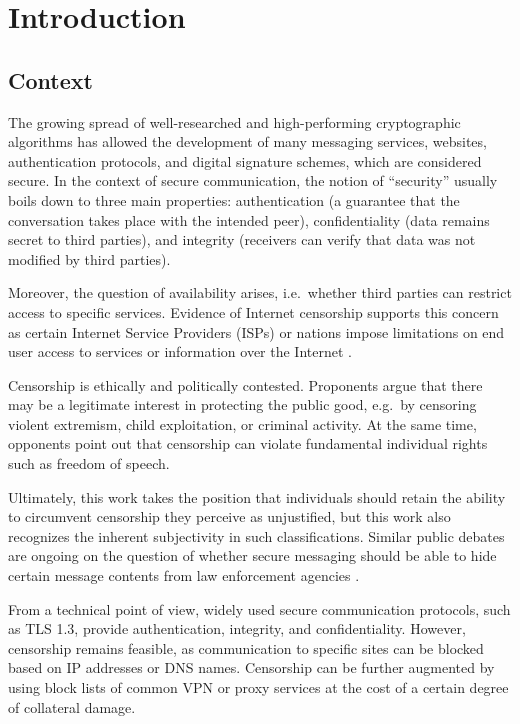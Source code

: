 \chapter{Introduction}\label{ch:introduction}

\section{Context} \label{sec:context}

The growing spread of well-researched and high-performing cryptographic algorithms has allowed the development of many messaging services, websites, authentication protocols, and digital signature schemes, which are considered secure.
In the context of secure communication, the notion of ``security'' usually boils down to three main properties: authentication (a guarantee that the conversation takes place with the intended peer), confidentiality (data remains secret to third parties), and integrity (receivers can verify that data was not modified by third parties).

Moreover, the question of availability arises, i.e.~whether third parties can restrict access to specific services. Evidence of Internet censorship supports this concern as certain Internet Service Providers (ISPs) or nations impose limitations on end user access to services or information over the Internet \cite{CCS:RSKE20,SP:NCWHRC20,master2023worldwide}.

Censorship is ethically and politically contested. Proponents argue that there may be a legitimate interest in protecting the public good, e.g.~by censoring violent extremism, child exploitation, or criminal activity. At the same time, opponents point out that censorship can violate fundamental individual rights such as freedom of speech.

Ultimately, this work takes the position that individuals should retain the ability to circumvent censorship they perceive as unjustified, but this work also recognizes the inherent subjectivity in such classifications. Similar public debates are ongoing on the question of whether secure messaging should be able to hide certain message contents from law enforcement agencies \cite{menn2019facebook,townsend2025encryption}.

From a technical point of view, widely used secure communication protocols, such as TLS 1.3, provide authentication, integrity, and confidentiality. However, censorship remains feasible, as communication to specific sites can be blocked based on IP addresses or DNS names. Censorship can be further augmented by using block lists of common VPN or proxy services at the cost of a certain degree of collateral damage.

